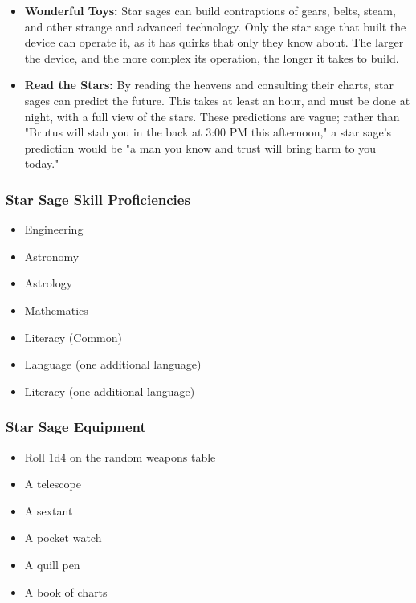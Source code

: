 \begin{multicols}{2}
\begin{itemize}
  \item \textbf{Wonderful Toys:} Star sages can build contraptions of gears, belts,
    steam, and other strange and advanced technology. Only the star sage that built
    the device can operate it, as it has quirks that only they know about. The larger
    the device, and the more complex its operation, the longer it takes to build.
  \item \textbf{Read the Stars:} By reading the heavens and consulting their charts,
    star sages can predict the future. This takes at least an hour, and must be done
    at night, with a full view of the stars. These predictions are vague; rather than
    "Brutus will stab you in the back at 3:00 PM this afternoon," a star sage's prediction
    would be "a man you know and trust will bring harm to you today."
\end{itemize}

\subsubsection{Star Sage Skill Proficiencies}

\begin{itemize}
  \item Engineering
  \item Astronomy
  \item Astrology
  \item Mathematics
  \item Literacy (Common)
  \item Language (one additional language)
  \item Literacy (one additional language)
\end{itemize}

\subsubsection{Star Sage Equipment}

\begin{itemize}
  \item Roll 1d4 on the random weapons table
  \item A telescope
  \item A sextant
  \item A pocket watch
  \item A quill pen
  \item A book of charts
\end{itemize}


\end{multicols}
